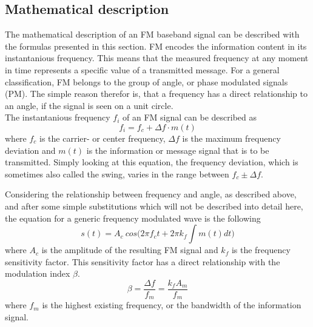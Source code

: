 \subsection{Mathematical description}

The mathematical description of an FM baseband signal can be described with the formulas presented in this section.
FM encodes the information content in its instantanious frequency.
This means that the measured frequency at any moment in time represents a specific value of a transmitted message.
For a general classification, FM belongs to the group of angle, or phase modulated signals (PM).
The simple reason therefor is, that a frequency has a direct relationship to an angle, if the signal is seen on a unit circle.\\

The instantanious frequency $f_i$ of an FM signal can be described as
\begin{equation}
  f_i = f_c + \Delta f \cdot m(t)
\end{equation}
where $f_c$ is the carrier- or center frequency, $\Delta f$ is the maximum frequency deviation and $m(t)$ is the information or message signal that is to be transmitted.
Simply looking at this equation, the frequency deviation, which is sometimes also called the swing, varies in the range between $f_c \pm \Delta f$.

Considering the relationship between frequency and angle, as described above, and after some simple substitutions which will not be described into detail here, the equation for a generic frequency modulated wave is the following
\begin{equation}
  s(t) = A_c\ cos \Big( 2 \pi f_c t + 2 \pi k_f \int m(t) dt \Big)
  \label{equ:fm_func}
\end{equation}
where $A_c$ is the amplitude of the resulting FM signal and $k_f$ is the frequency sensitivity factor.
This sensitivity factor has a direct relationship with the modulation index $\beta$.
\begin{equation}
  \beta = \frac{\Delta f}{f_m} = \frac{k_f A_m}{f_m}
\end{equation}
where $f_m$ is the highest existing frequency, or the bandwidth of the information signal.

